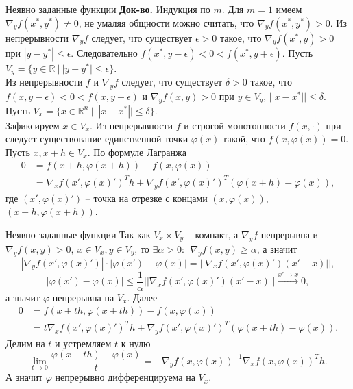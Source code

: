 \documentclass[10pt, handout]{beamer}
\begin{document}
\begin{frame}{Неявно заданные функции}
\textbf{Док-во.} Индукция по $m$. Для $m=1$ имеем $\nabla_yf(x^*, y^*)\neq 0$, не умаляя общности можно считать, что $\nabla_yf(x^*, y^*)>0$. Из непрерывности $\nabla_yf$ следует, что существует $\epsilon>0$ такое, что $\nabla_yf(x^*,y)>0$ при $|y-y^*|\leq\epsilon$. Следовательно $f(x^*, y-\epsilon)<0<f(x^*,y+\epsilon)$. Пусть $V_y=\{y\in \mathbb{R}~|~|y-y^*|\leq \epsilon\}$. \\
\pause
\vspace{1em}
Из непрерывности $f$ и $\nabla_yf$ следует, что существует $\delta>0$ такое, что $f(x, y-\epsilon)<0<f(x,y+\epsilon)$ и $\nabla_yf(x,y)>0$ при $y\in V_y$, $||x-x^*||\leq \delta$. Пусть $V_x=\{x\in \mathbb{R}^n~|~||x-x^*||\leq \delta\}$.\\
\pause
\vspace{1em}
Зафиксируем $x\in V_x$. Из непрерывности $f$ и строгой монотонности $f(x, \cdot)$ при  следует существование единственной точки $\varphi(x)$ такой, что $f(x, \varphi(x))=0$.\\
\pause
\vspace{1em}
Пусть $x, x+h\in V_x$. По формуле Лагранжа
\begin{align*}
0&=f(x+h, \varphi(x+h))-f(x, \varphi(x))\\
&=\nabla_xf(x', \varphi(x)')^Th+\nabla_yf(x', \varphi(x)')^T(\varphi(x+h)-\varphi(x)),
\end{align*}
где $(x', \varphi(x)')$ -- точка на отрезке с концами $(x, \varphi(x))$, $(x+h, \varphi(x+h))$.
\end{frame}

\begin{frame}{Неявно заданные функции}
Так как $V_x\times V_y$ -- компакт, а $\nabla_y f$ непрерывна и $\nabla_y f(x,y)>0,~x\in V_x, y\in V_y$, то $\exists \alpha>0:~~\nabla_yf(x, y)\geq \alpha$, а значит
$$
|\nabla_yf(x', \varphi(x)')|\cdot|\varphi(x')-\varphi(x)|=||\nabla_xf(x', \varphi(x)')(x'-x)||,
$$
$$
|\varphi(x')-\varphi(x)|\leq \frac{1}{\alpha}||\nabla_xf(x', \varphi(x)')(x'-x)||\xrightarrow{x'\rightarrow x} 0,
$$
а значит $\varphi$ непрерывна на $V_x$. \pause Далее
\begin{align*}
0&=f(x+th, \varphi(x+th))-f(x, \varphi(x))\\
&=t
\nabla_xf(x', \varphi(x)')^Th+\nabla_yf(x', \varphi(x)')^T(\varphi(x+th)-\varphi(x)).
\end{align*}
\pause
Делим на $t$ и устремляем $t$ к нулю 
$$
\lim_{t\rightarrow 0}\frac{\varphi(x+th)-\varphi(x)}{t}=-\nabla_yf(x,\varphi(x))^{-1}\nabla_xf(x,\varphi(x))^Th.
$$
А значит $\varphi$ непрерывно дифференцируема на $V_x$.

\end{frame}
\end{document}
